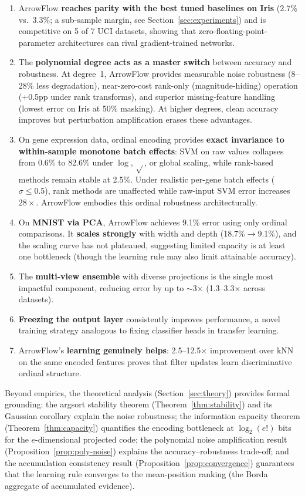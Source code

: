\documentclass[12pt]{article}
\begin{document}
\begin{enumerate}[leftmargin=2em]
  \item ArrowFlow \textbf{reaches parity with the best tuned baselines on Iris} (2.7\% vs.\ 3.3\%; a sub-sample margin, see Section~\ref{sec:experiments}) and is competitive on 5 of 7 UCI datasets, showing that zero-floating-point-parameter architectures can rival gradient-trained networks.
  \item The \textbf{polynomial degree acts as a master switch} between accuracy and robustness. At degree~1, ArrowFlow provides measurable noise robustness (8--28\% less degradation), near-zero-cost rank-only (magnitude-hiding) operation (+0.5pp under rank transforms), and superior missing-feature handling (lowest error on Iris at 50\% masking). At higher degrees, clean accuracy improves but perturbation amplification erases these advantages.
  \item On gene expression data, ordinal encoding provides \textbf{exact invariance to within-sample monotone batch effects}: SVM on raw values collapses from 0.6\% to 82.6\% under $\log$, $\sqrt{}$, or global scaling, while rank-based methods remain stable at 2.5\%. Under realistic per-gene batch effects ($\sigma \leq 0.5$), rank methods are unaffected while raw-input SVM error increases $28\times$. ArrowFlow embodies this ordinal robustness architecturally.
  \item On \textbf{MNIST via PCA}, ArrowFlow achieves 9.1\% error using only ordinal comparisons. It \textbf{scales strongly} with width and depth (18.7\%$\to$9.1\%), and the scaling curve has not plateaued, suggesting limited capacity is at least one bottleneck (though the learning rule may also limit attainable accuracy).
  \item The \textbf{multi-view ensemble} with diverse projections is the single most impactful component, reducing error by up to $\sim$3$\times$ (1.3--3.3$\times$ across datasets).
  \item \textbf{Freezing the output layer} consistently improves performance, a novel training strategy analogous to fixing classifier heads in transfer learning.
  \item ArrowFlow's \textbf{learning genuinely helps}: 2.5--12.5$\times$ improvement over kNN on the same encoded features proves that filter updates learn discriminative ordinal structure.
\end{enumerate}

Beyond empirics, the theoretical analysis (Section~\ref{sec:theory}) provides formal grounding: the argsort stability theorem (Theorem~\ref{thm:stability}) and its Gaussian corollary explain the noise robustness; the information capacity theorem (Theorem~\ref{thm:capacity}) quantifies the encoding bottleneck at $\log_2(e!)$ bits for the $e$-dimensional projected code; the polynomial noise amplification result (Proposition~\ref{prop:poly-noise}) explains the accuracy--robustness trade-off; and the accumulation consistency result (Proposition~\ref{prop:convergence}) guarantees that the learning rule converges to the mean-position ranking (the Borda aggregate of accumulated evidence).
\end{document}

